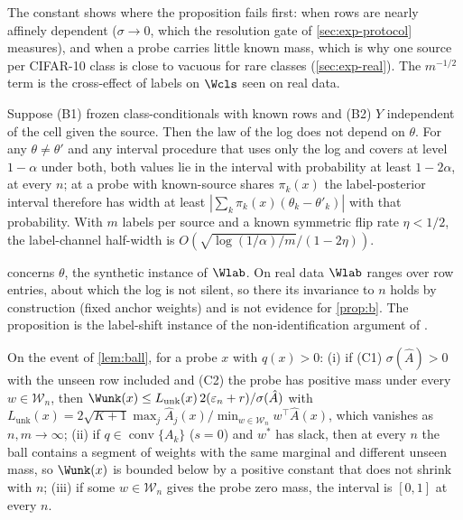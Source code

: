 The constant shows where the proposition fails first: when rows are nearly affinely dependent
($\sigma\to0$, which the resolution gate of \cref{sec:exp-protocol} measures), and when a probe
carries little known mass, which is why one source per CIFAR-10 class is close to vacuous for rare
classes (\cref{sec:exp-real}). The $m^{-1/2}$ term is the cross-effect of labels on $\Wcls$ seen on
real data.

\begin{proposition}
\label{prop:b}
Suppose (B1) frozen class-conditionals with known rows and (B2) $Y$ independent of the cell given the
source. Then the law of the log does not depend on $\theta$. For any $\theta\neq\theta'$ and any
interval procedure that uses only the log and covers at level $1-\alpha$ under both, both values lie
in the interval with probability at least $1-2\alpha$, at every $n$; at a probe with known-source
shares $\pi_k(x)$ the label-posterior interval therefore has width at least
$|\sum_k\pi_k(x)(\theta_k-\theta'_k)|$ with that probability. With $m$ labels per source and a known
symmetric flip rate $\eta<1/2$, the label-channel half-width is $O(\sqrt{\log(1/\alpha)/m}/(1-2\eta))$.
\end{proposition}

 concerns $\theta$, the synthetic instance of $\Wlab$. On real data $\Wlab$ ranges over
row entries, about which the log is not silent, so there its invariance to $n$ holds by
construction (fixed anchor weights) and is not evidence for \cref{prop:b}. The proposition is the
label-shift instance of the non-identification argument of \citet{young2026epistemic}.

\begin{proposition}
\label{prop:c}
On the event of \cref{lem:ball}, for a probe $x$ with $q(x)>0$:
(i) if (C1) $\sigma(\hat A)>0$ with the unseen row included and (C2) the probe has positive mass under
every $w\in\mathcal W_n$, then $\Wunk(x)\le L_{\mathrm{unk}}(x)\,2(\varepsilon_n+r)/\sigma(\hat A)$ with
$L_{\mathrm{unk}}(x)=2\sqrt{K+1}\max_{j}\hat A_j(x)/\min_{w\in\mathcal W_n}w^{\top}\hat A(x)$, which
vanishes as $n,m\to\infty$;
(ii) if $q\in\operatorname{conv}\{A_k\}$ ($s=0$) and $w^{*}$ has slack, then at every $n$ the ball
contains a segment of weights with the same marginal and different unseen mass, so $\Wunk(x)$ is
bounded below by a positive constant that does not shrink with $n$;
(iii) if some $w\in\mathcal W_n$ gives the probe zero mass, the interval is $[0,1]$ at every $n$.
\end{proposition}

